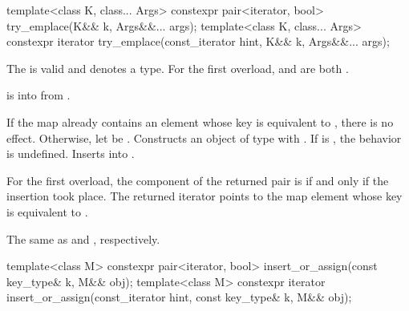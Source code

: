%
\begin{itemdecl}
template<class K, class... Args>
  constexpr pair<iterator, bool> try_emplace(K&& k, Args&&... args);
template<class K, class... Args>
  constexpr iterator try_emplace(const_iterator hint, K&& k, Args&&... args);
\end{itemdecl}

\begin{itemdescr}
\pnum
\constraints
The  
is valid and denotes a type.
For the first overload,
 and
are both .

\pnum
\expects
{} is  into  from
.

\pnum
\effects
If the map already contains an element whose key is equivalent to ,
there is no effect.
Otherwise, let  be .
Constructs an object  of type  with
.\linebreak
If  is ,
the behavior is undefined.
Inserts  into .

\pnum
\returns
For the first overload,
the  component of the returned pair is 
if and only if the insertion took place.
The returned iterator points to the map element
whose key is equivalent to .

\pnum
\complexity
The same as  and , respectively.
\end{itemdescr}

%
\begin{itemdecl}
template<class M>
  constexpr pair<iterator, bool> insert_or_assign(const key_type& k, M&& obj);
template<class M>
  constexpr iterator insert_or_assign(const_iterator hint, const key_type& k, M&& obj);
\end{itemdecl}

